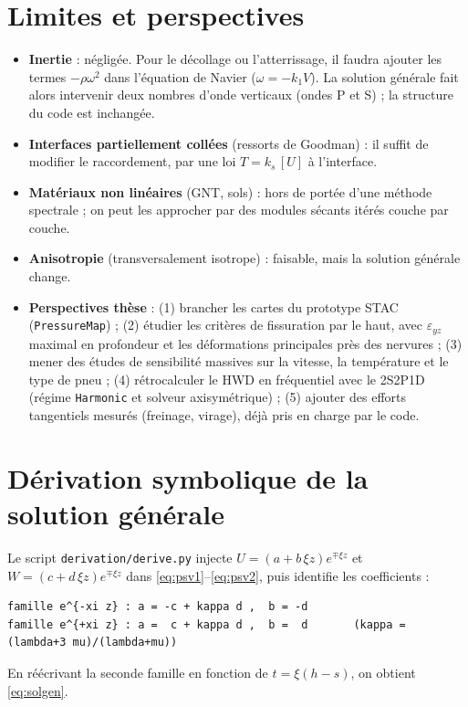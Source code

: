 \documentclass[11pt,a4paper]{article}
\renewcommand{\epsilon}{\varepsilon}
\begin{document}
\section{Limites et perspectives}\label{sec:limites}
\begin{itemize}[nosep]
\item \textbf{Inertie} : négligée. Pour le décollage ou l'atterrissage, il faudra ajouter les termes
      $-\rho\omega^2$ dans l'équation de Navier ($\omega=-k_1V$). La solution générale fait alors
      intervenir deux nombres d'onde verticaux (ondes P et S) ; la structure du code est inchangée.
\item \textbf{Interfaces partiellement collées} (ressorts de Goodman) : il suffit de modifier le
      raccordement, par une loi $T=k_s\,[U]$ à l'interface.
\item \textbf{Matériaux non linéaires} (GNT, sols) : hors de portée d'une méthode spectrale ; on
      peut les approcher par des modules sécants itérés couche par couche.
\item \textbf{Anisotropie} (transversalement isotrope) : faisable, mais la solution générale change.
\item \textbf{Perspectives thèse} : (1) brancher les cartes du prototype STAC (\texttt{PressureMap}) ;
      (2) étudier les critères de fissuration par le haut, avec $\epsilon_{yz}$ maximal en
      profondeur et les déformations principales près des nervures ; (3) mener des études de
      sensibilité massives sur la vitesse, la température et le type de pneu ; (4) rétrocalculer
      le HWD en fréquentiel avec le 2S2P1D (régime \texttt{Harmonic} et solveur axisymétrique) ;
      (5) ajouter des efforts tangentiels mesurés (freinage, virage), déjà pris en charge par le code.
\end{itemize}

\appendix
\section{Dérivation symbolique de la solution générale}\label{ann:sympy}
Le script \texttt{derivation/derive.py} injecte
$U=(a+b\,\xi z)e^{\mp\xi z}$ et $W=(c+d\,\xi z)e^{\mp\xi z}$ dans \eqref{eq:psv1}--\eqref{eq:psv2},
puis identifie les coefficients :
\begin{lstlisting}
famille e^{-xi z} : a = -c + kappa d ,  b = -d
famille e^{+xi z} : a =  c + kappa d ,  b =  d       (kappa = (lambda+3 mu)/(lambda+mu))
\end{lstlisting}
En réécrivant la seconde famille en fonction de $t=\xi(h-s)$, on obtient \eqref{eq:solgen}.
\end{document}
